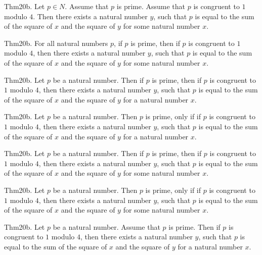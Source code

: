 \documentclass{article}
\begin{document}
Thm20b. Let $p \in N$. Assume that $p$ is prime. Assume that $p$ is congruent to $1$ modulo $4$. Then there exists a natural number $y$, such that $p$ is equal to the sum of the square of $x$ and the square of $y$ for some natural number $x$.

Thm20b. For all natural numbers $p$, if $p$ is prime, then if $p$ is congruent to $1$ modulo $4$, then there exists a natural number $y$, such that $p$ is equal to the sum of the square of $x$ and the square of $y$ for some natural number $x$.

Thm20b. Let $p$ be a natural number. Then if $p$ is prime, then if $p$ is congruent to $1$ modulo $4$, then there exists a natural number $y$, such that $p$ is equal to the sum of the square of $x$ and the square of $y$ for a natural number $x$.

Thm20b. Let $p$ be a natural number. Then $p$ is prime, only if if $p$ is congruent to $1$ modulo $4$, then there exists a natural number $y$, such that $p$ is equal to the sum of the square of $x$ and the square of $y$ for a natural number $x$.

Thm20b. Let $p$ be a natural number. Then if $p$ is prime, then if $p$ is congruent to $1$ modulo $4$, then there exists a natural number $y$, such that $p$ is equal to the sum of the square of $x$ and the square of $y$ for some natural number $x$.

Thm20b. Let $p$ be a natural number. Then $p$ is prime, only if if $p$ is congruent to $1$ modulo $4$, then there exists a natural number $y$, such that $p$ is equal to the sum of the square of $x$ and the square of $y$ for some natural number $x$.

Thm20b. Let $p$ be a natural number. Assume that $p$ is prime. Then if $p$ is congruent to $1$ modulo $4$, then there exists a natural number $y$, such that $p$ is equal to the sum of the square of $x$ and the square of $y$ for a natural number $x$.
\end{document}
